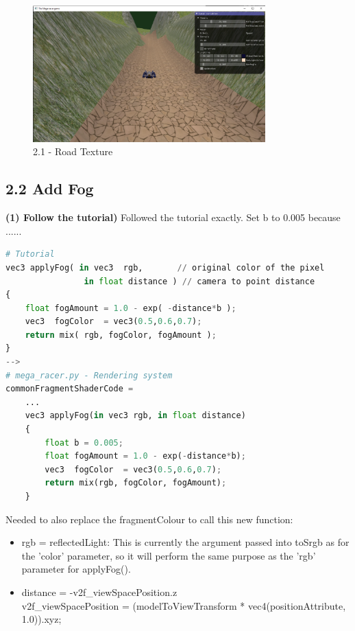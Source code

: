 \documentclass[a4 paper, 12pt]{article}
\begin{document}
    \begin{figure} [H]
        \centering
        \includegraphics[width=0.8\textwidth, frame]
            {./images/mega_racer/2.1_c_final.PNG}
        \caption{2.1 - Road Texture}   
    \end{figure}

\subsection{2.2 Add Fog}

\textbf{(1) Follow the tutorial)}
Followed the tutorial exactly. Set b to 0.005 because ......

\begin{lstlisting}[language=python]
# Tutorial
vec3 applyFog( in vec3  rgb,       // original color of the pixel
                in float distance ) // camera to point distance
{
    float fogAmount = 1.0 - exp( -distance*b );
    vec3  fogColor  = vec3(0.5,0.6,0.7);
    return mix( rgb, fogColor, fogAmount );
}
-->
# mega_racer.py - Rendering system
commonFragmentShaderCode = 
    ...
    vec3 applyFog(in vec3 rgb, in float distance)
    {
        float b = 0.005;
        float fogAmount = 1.0 - exp(-distance*b);
        vec3  fogColor  = vec3(0.5,0.6,0.7);
        return mix(rgb, fogColor, fogAmount);
    }
\end{lstlisting} 

Needed to also replace the fragmentColour to call this new function:
    \begin{itemize}
        \item rgb = reflectedLight: This is currently the argument passed into toSrgb as for the 'color' parameter, so it will perform the same purpose as the 'rgb' parameter for applyFog().
        \item distance = -v2f\_viewSpacePosition.z \\      
        v2f\_viewSpacePosition = (modelToViewTransform * vec4(positionAttribute, 1.0)).xyz;
    \end{itemize}
\end{document}
